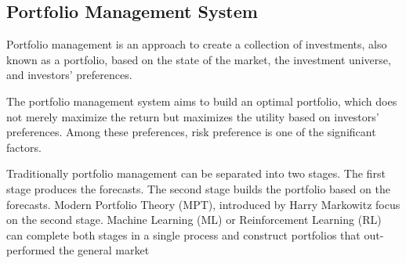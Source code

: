 \subsection {Portfolio Management System}
Portfolio management is an approach to create a collection of investments, also known as a portfolio, based on the state of the market, the investment universe, and investors' preferences.

The portfolio management system aims to build an optimal portfolio, which does not merely maximize the return but maximizes the utility based on investors' preferences. Among these preferences, risk preference is one of the significant factors.

Traditionally portfolio management can be separated into two stages. The first stage produces the forecasts. The second stage builds the portfolio based on the forecasts.  Modern Portfolio Theory (MPT), introduced by  Harry Markowitz \cite{10.2307/2975974} focus on the second stage. Machine Learning (ML) or Reinforcement Learning (RL) can complete both stages in a single process and construct portfolios that out-performed the general market\cite{KRAUSS2017689, moody2001learning}
